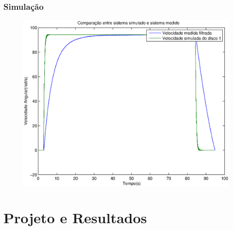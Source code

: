 \documentclass{beamer}
\begin{document}
\begin{frame}
\frametitle{Simulação}
\begin{figure}
	\centering
	\includegraphics[width=0.7\linewidth]{simv}
\end{figure}
\end{frame}

\section{Projeto e Resultados}
\end{document}
